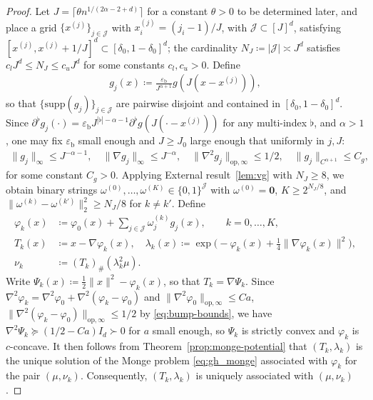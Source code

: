 \documentclass[11pt,reqno]{amsart}
\theoremstyle{definition}
\newcommand{\mJ}{\mathcal{J}}
\newcommand{\supp}{\mathrm{supp}}
\begin{document}
\begin{proof}
Let $J=\lceil\theta  n^{1/(2\alpha-2+d)}\rceil$ for a constant $\theta>0$ to be determined later, and place a grid $\{x^{(j)}\}_{j\in\mJ}$ with $x^{(j)}_i=(j_i-1)/J$, with $\mJ\subset[J]^d$, satisfying $[x^{(j)},x^{(j)}+1/J]^d\subset[\delta_0,1-\delta_0]^d$; the cardinality $N_J\coloneqq|\mJ|\asymp J^d$ satisfies $c_{l} J^d\le N_J\le c_{u} J^d$ for some constants $c_{l},c_{u}>0$. Define
\begin{align}
    g_j(x) \coloneqq \frac{\varepsilon_{\mathrm b}}{J^{\alpha+1}} g(J(x-x^{(j)})),
\end{align}
so that $\{\supp (g_j)\}_{j\in\mJ}$ are pairwise disjoint and contained in $[\delta_0,1-\delta_0]^d$. Since $\partial^\flat g_j(\cdot)=\varepsilon_{\mathrm b}  J^{|\flat|-\alpha-1}\partial^\flat g(J(\cdot-x^{(j)}))$ for any multi-index $\flat$, and $\alpha>1$, one may fix $\varepsilon_{\mathrm b}$ small enough and $J\ge J_0$ large enough that uniformly in $j,J$:
\begin{align}
    \label{eq:bump-bounds}
    \|g_j\|_\infty\le J^{-\alpha-1}, \quad \|\nabla g_j\|_\infty\le J^{-\alpha}, \quad \|\nabla^2 g_j\|_{\mathrm{op},\infty}\le 1/2, \quad \|g_j\|_{C^{\alpha+1}}\le C_g,
\end{align}
for some constant $C_g>0$. Applying External result~\ref{lem:vg} with $N_J\ge 8$, we obtain binary strings $\omega^{(0)},\dots,\omega^{(K)}\in\{0,1\}^{\mJ}$ with $\omega^{(0)}=\mathbf{0}$, $K\ge 2^{N_J/8}$, and $\|\omega^{(k)}-\omega^{(k')}\|_2^2\ge N_J/8$ for $k\ne k'$. Define
\begin{align}
    \varphi_k(x) &\coloneqq \varphi_0(x) + \sum_{j\in\mJ}\omega^{(k)}_j g_j(x),\qquad k=0,\dots,K,\\
    T_k(x) &\coloneqq x - \nabla \varphi_k(x), \quad \lambda_k(x)\coloneqq\exp \Big( -\varphi_k(x)+\frac1{4}\|\nabla \varphi_k(x)\|^2\Big),\\
    \nu_k &\coloneqq (T_k)_\#(\lambda_k^2\mu).
\end{align}
Write $\Psi_k(x)\coloneqq\frac1{2}\|x\|^2-\varphi_k(x)$, so that $T_k=\nabla\Psi_k$. Since $\nabla^2 \varphi_k = \nabla^2 \varphi_0 + \nabla^2(\varphi_k-\varphi_0)$ and $\|\nabla^2 \varphi_0\|_{\mathrm{op},\infty}\le Ca$, $\|\nabla^2(\varphi_k-\varphi_0)\|_{\mathrm{op},\infty}\le 1/2$ by \eqref{eq:bump-bounds}, we have $\nabla^2\Psi_k\succeq(1/2-Ca)I_d\succ 0$ for $a$ small enough, so $\Psi_k$ is strictly convex and $\varphi_k$ is $c$-concave. It then follows from Theorem~\ref{prop:monge-potential} that $(T_k,\lambda_k)$ is the unique solution of the Monge problem \eqref{eq:gh_monge} associated with $\varphi_k$ for the pair $(\mu,\nu_k)$. Consequently, $(T_k,\lambda_k)$ is uniquely associated with $(\mu,\nu_k)$.


\end{proof}
\end{document}
